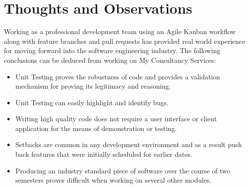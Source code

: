 \section{Thoughts and Observations}
Working as a professional development team using an Agile Kanban workflow along with feature branches and pull requests has provided real world experience for moving forward into the software engineering industry. The following conclusions can be deduced from working on My Consultancy Services:

\begin{itemize}
\item{Unit Testing proves the robustness of code and provides a validation mechanism for proving its legitimacy and reasoning. }
\item{Unit Testing can easily highlight and identify bugs. }
\item{Writing high quality code does not require a user interface or client application for the means of demonstration or testing. }
\item{Setbacks are common in any development environment and as a result push back features that were initially scheduled for earlier dates.}
\item{Producing an industry standard piece of software over the course of two semesters proves difficult when working on several other modules. }
\end{itemize}
